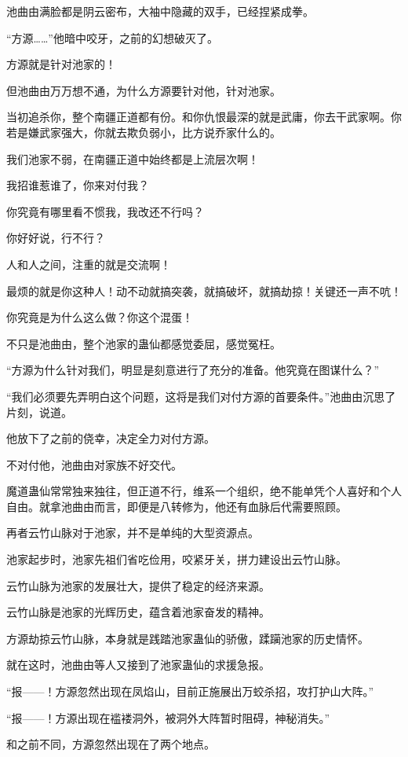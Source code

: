 \begin{this_body}
池曲由满脸都是阴云密布，大袖中隐藏的双手，已经捏紧成拳。

“方源……”他暗中咬牙，之前的幻想破灭了。

方源就是针对池家的！

但池曲由万万想不通，为什么方源要针对他，针对池家。

当初追杀你，整个南疆正道都有份。和你仇恨最深的就是武庸，你去干武家啊。你若是嫌武家强大，你就去欺负弱小，比方说乔家什么的。

我们池家不弱，在南疆正道中始终都是上流层次啊！

我招谁惹谁了，你来对付我？

你究竟有哪里看不惯我，我改还不行吗？

你好好说，行不行？

人和人之间，注重的就是交流啊！

最烦的就是你这种人！动不动就搞突袭，就搞破坏，就搞劫掠！关键还一声不吭！

你究竟是为什么这么做？你这个混蛋！

不只是池曲由，整个池家的蛊仙都感觉委屈，感觉冤枉。

“方源为什么针对我们，明显是刻意进行了充分的准备。他究竟在图谋什么？”

“我们必须要先弄明白这个问题，这将是我们对付方源的首要条件。”池曲由沉思了片刻，说道。

他放下了之前的侥幸，决定全力对付方源。

不对付他，池曲由对家族不好交代。

魔道蛊仙常常独来独往，但正道不行，维系一个组织，绝不能单凭个人喜好和个人自由。就拿池曲由而言，即便是八转修为，他还有血脉后代需要照顾。

再者云竹山脉对于池家，并不是单纯的大型资源点。

池家起步时，池家先祖们省吃俭用，咬紧牙关，拼力建设出云竹山脉。

云竹山脉为池家的发展壮大，提供了稳定的经济来源。

云竹山脉是池家的光辉历史，蕴含着池家奋发的精神。

方源劫掠云竹山脉，本身就是践踏池家蛊仙的骄傲，蹂躏池家的历史情怀。

就在这时，池曲由等人又接到了池家蛊仙的求援急报。

“报——！方源忽然出现在凤焰山，目前正施展出万蛟杀招，攻打护山大阵。”

“报——！方源出现在褴褛洞外，被洞外大阵暂时阻碍，神秘消失。”

和之前不同，方源忽然出现在了两个地点。


\end{this_body}
